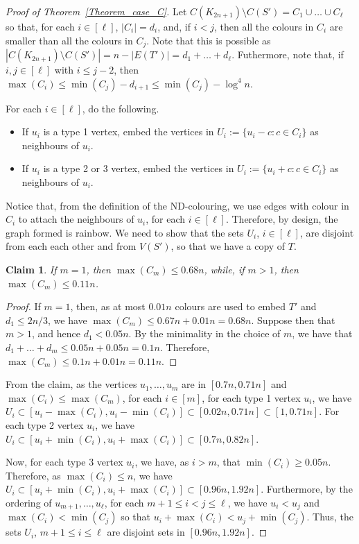 \documentclass{article}
\newtheorem{claim}[lemma]{Claim}
\theoremstyle{definition}
\begin{document}
\begin{proof}[Proof of Theorem~\ref{Theorem_case_C}]
Let $C(K_{2n+1})\setminus C(S')=C_1\cup \ldots \cup C_\ell$ so that, for each $i\in [\ell]$, $|C_i|=d_i$, and, if $i<j$, then all the colours in $C_i$ are smaller than all the colours in $C_j$. Note that this is possible as $|C(K_{2n+1})\setminus C(S')|=n-|E(T')|=d_1+\ldots+d_\ell$.
Futhermore, note that, if $i,j\in [\ell]$ with $i\leq j-2$, then $\max(C_i)\leq \min (C_j)-d_{i+1}\leq \min(C_j)-\log^4 n$.

For each $i\in [\ell]$, do the following.
\begin{itemize}
\item If $u_i$ is a type 1 vertex, embed the vertices in $U_i:=\{u_i-c:c\in C_{i}\}$ as neighbours of $u_i$.
\item If $u_i$ is a type 2 or 3 vertex, embed the vertices in $U_i:=\{u_i+c:c\in C_{i}\}$ as neighbours of $u_i$.
\end{itemize}

Notice that, from the definition of the ND-colouring, we use edges with colour in $C_i$ to attach the neighbours of $u_i$, for each $i\in [\ell]$. Therefore, by design, the graph formed is rainbow. We need to show that the sets $U_i$, $i\in [\ell]$, are disjoint from each each other and from $V(S')$, so that we have a copy of $T$.

\begin{claim} If $m=1$, then $\max(C_m)\leq 0.68n$, while, if $m>1$, then $\max(C_m)\leq 0.11n$.
\end{claim}
\begin{proof}
If $m=1$, then, as at most $0.01n$ colours are used to embed $T'$ and $d_1\leq 2n/3$, we have $\max(C_m)\leq 0.67n+0.01n=0.68n$.
Suppose then that $m>1$, and hence $d_1<0.05n$. By the minimality in the choice of $m$, we have that $d_1+\ldots+d_m\leq  0.05n+0.05n=0.1n$. Therefore, $\max(C_m)\leq 0.1n+0.01n= 0.11n$.
\end{proof}

From the claim, as the vertices $u_1,\ldots,u_m$ are in $[0.7n,0.71n]$ and $\max(C_i) \leq \max (C_m)$, for each $i\in [m]$, for each type 1 vertex $u_{i}$, we have $U_{i}\subset [u_{i}-\max (C_i),u_i-\min(C_i)]\subset [0.02n,0.71n] \subset [1,0.71n]$. For each type 2 vertex $u_{i}$, we have $U_{i}\subset [u_{i}+\min (C_i),u_{i}+\max(C_i)]\subset [0.7n,0.82n]$.

Now, for each type 3 vertex $u_{i}$, we have, as $i>m$, that $\min(C_i)\geq 0.05n$. Therefore, as $\max(C_i)\leq n$, we have $U_{i}\subset [u_{i}+\min (C_i),u_{i}+\max(C_i)]\subset [0.96n,1.92n]$. Furthermore, by the ordering of $u_{m+1},\ldots,u_\ell$, for each $m+1\leq i<j\leq \ell$, we have $u_i<u_j$ and $\max(C_i)<\min(C_j)$ so that
$u_{i}+\max (C_i)< u_{j}+\min (C_j)$. Thus, the sets $U_i$, $m+1\leq i\leq \ell$ are disjoint sets in $[0.96n,1.92n]$.



\end{proof}
\end{document}
